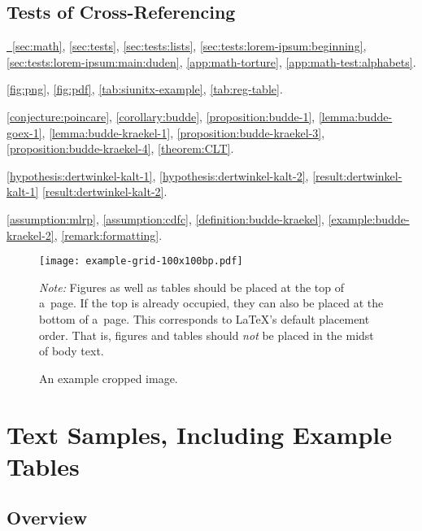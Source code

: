 \documentclass[12pt, a4paper, oneside]{article}
\newlength{\footnotelinespacing}
\newlength{\fsfootnote}
\let \footnotesizeOrig \footnotesize
\renewcommand{\footnotesize}{\footnotesizeOrig\fontsize{\fsfootnote}{\footnotelinespacing}\selectfont}
\renewcommand{\caps}[1]{{\textscale{0.97}{\textls[50]{\MakeUppercase{#1}}}}}
\newenvironment{figurenotes}[1][Note]
	{\par\justifying\medskip\begingroup\footnotesize\noindent\strut\textit{#1:} \ignorespaces}
	{\par\endgroup}
\theoremstyle{Plain}
\theoremstyle{Definition}
\theoremstyle{Remark}
\begin{document}
\subsection{Tests of Cross-Referencing}

\hyperref[sec:math]{\titlecap{\sectionautorefname}~\ref{sec:math}}, \autoref{sec:tests}, \autoref{sec:tests:lists}, \autoref{sec:tests:lorem-ipsum:beginning}, \autoref{sec:tests:lorem-ipsum:main:duden}, \autoref{app:math-torture}, \autoref{app:math-test:alphabets}.

\autoref{fig:png}, \autoref{fig:pdf}, \autoref{tab:siunitx-example}, \autoref{tab:reg-table}.

\autoref{conjecture:poincare}, \autoref{corollary:budde}, \autoref{proposition:budde-1}, \autoref{lemma:budde-goex-1}, \autoref{lemma:budde-kraekel-1}, \autoref{proposition:budde-kraekel-3}, \autoref{proposition:budde-kraekel-4}, \autoref{theorem:CLT}.

\autoref{hypothesis:dertwinkel-kalt-1}, \autoref{hypothesis:dertwinkel-kalt-2}, \autoref{result:dertwinkel-kalt-1} \autoref{result:dertwinkel-kalt-2}.

\autoref{assumption:mlrp}, \autoref{assumption:cdfc}, \autoref{definition:budde-kraekel}, \autoref{example:budde-kraekel-2}, \autoref{remark:formatting}.

\begin{figure}[t]
	\texttt{[image: example-grid-100x100bp.pdf]}%
	\caption{An example cropped \caps{PDF} image.}
	\label{fig:pdf}
	\begin{figurenotes}
		Figures as well as tables should be placed at the top of a~page. If the top is already occupied, they can also be placed at the bottom of a~page. This corresponds to LaTeX's default placement order. That is, figures and tables should \emph{not} be placed in the midst of body text.
	\end{figurenotes}
\end{figure}


\section{Text Samples, Including Example Tables}

\subsection{Overview}
\end{document}
